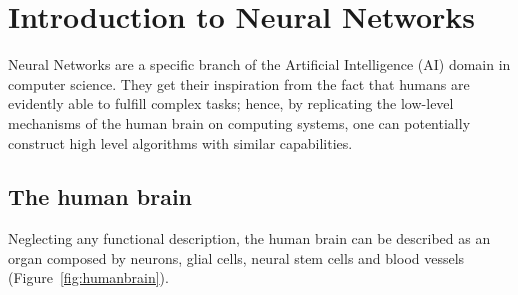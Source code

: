 \section{Introduction to Neural Networks}
Neural Networks are a specific branch of the Artificial Intelligence (AI) domain in computer science.
They get their inspiration from the fact that humans are evidently able to fulfill complex tasks; hence, by replicating the low-level mechanisms of the human brain on computing systems, one can potentially construct high level algorithms with similar capabilities.

\subsection{The human brain}
\label{subsect:brain}
Neglecting any functional description, the human brain can be described as an organ composed by neurons, glial cells, neural stem cells and blood vessels (Figure~\ref{fig:humanbrain}).
